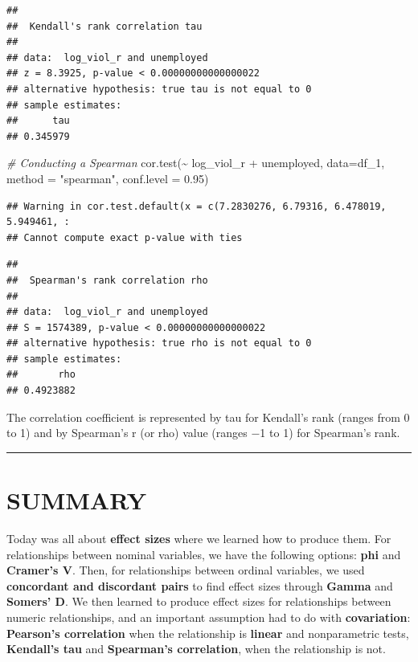 \documentclass[
]{book}
\newenvironment{Shaded}{\begin{snugshade}}{\end{snugshade}}
\newcommand{\AttributeTok}[1]{\textcolor[rgb]{0.77,0.63,0.00}{#1}}
\newcommand{\CommentTok}[1]{\textcolor[rgb]{0.56,0.35,0.01}{\textit{#1}}}
\newcommand{\FloatTok}[1]{\textcolor[rgb]{0.00,0.00,0.81}{#1}}
\newcommand{\FunctionTok}[1]{\textcolor[rgb]{0.00,0.00,0.00}{#1}}
\newcommand{\NormalTok}[1]{#1}
\newcommand{\SpecialCharTok}[1]{\textcolor[rgb]{0.00,0.00,0.00}{#1}}
\newcommand{\StringTok}[1]{\textcolor[rgb]{0.31,0.60,0.02}{#1}}
\begin{document}
\begin{verbatim}
## 
##  Kendall's rank correlation tau
## 
## data:  log_viol_r and unemployed
## z = 8.3925, p-value < 0.00000000000000022
## alternative hypothesis: true tau is not equal to 0
## sample estimates:
##      tau 
## 0.345979
\end{verbatim}

\begin{Shaded}
\begin{Highlighting}[]
\CommentTok{\# Conducting a Spearman}
\FunctionTok{cor.test}\NormalTok{(}\SpecialCharTok{\textasciitilde{}}\NormalTok{ log\_viol\_r }\SpecialCharTok{+}\NormalTok{ unemployed, }\AttributeTok{data=}\NormalTok{df\_1, }\AttributeTok{method =} \StringTok{"spearman"}\NormalTok{, }\AttributeTok{conf.level =} \FloatTok{0.95}\NormalTok{)}
\end{Highlighting}
\end{Shaded}

\begin{verbatim}
## Warning in cor.test.default(x = c(7.2830276, 6.79316, 6.478019, 5.949461, :
## Cannot compute exact p-value with ties
\end{verbatim}

\begin{verbatim}
## 
##  Spearman's rank correlation rho
## 
## data:  log_viol_r and unemployed
## S = 1574389, p-value < 0.00000000000000022
## alternative hypothesis: true rho is not equal to 0
## sample estimates:
##       rho 
## 0.4923882
\end{verbatim}

The correlation coefficient is represented by tau for Kendall's rank (ranges from 0 to 1) and by Spearman's r (or rho) value (ranges −1 to 1) for Spearman's rank.

\begin{center}\rule{0.5\linewidth}{0.5pt}\end{center}

\hypertarget{summary-7}{%
\section{SUMMARY}\label{summary-7}}

Today was all about \textbf{effect sizes} where we learned how to produce them. For relationships between nominal variables, we have the following options: \textbf{phi} and \textbf{Cramer's V}. Then, for relationships between ordinal variables, we used \textbf{concordant and discordant pairs} to find effect sizes through \textbf{Gamma} and \textbf{Somers' D}. We then learned to produce effect sizes for relationships between numeric relationships, and an important assumption had to do with \textbf{covariation}: \textbf{Pearson's correlation} when the relationship is \textbf{linear} and nonparametric tests, \textbf{Kendall's tau} and \textbf{Spearman's correlation}, when the relationship is not.
\end{document}
